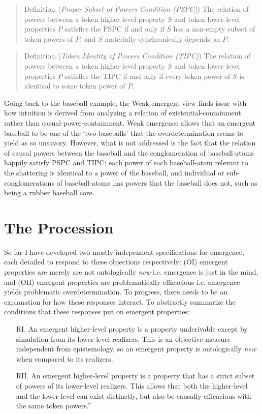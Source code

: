 \documentclass{article}
\newcommand{\ti}[1]{\textit{#1}}
\newcommand{\definition}{{\sc Definition.}\,}
\begin{document}
\begin{quote}
\definition (\ti{Proper Subset of Powers Condition (PSPC)}) The relation of powers between a token higher-level property $S$ and token lower-level properties $P$ satisfies the PSPC if and only if $S$ has a non-empty subset of token powers of $P$, and $S$ materially-synchronically depends on $P$.
\end{quote}

\begin{quote}
\definition (\ti{Token Identity of Powers Condition (TIPC)}) The relation of powers between a token higher-level property $S$ and token lower-level properties $P$ satisfies the TIPC if and only if every token power of $S$ is identical to some token power of $P$.
\end{quote}

Going back to the baseball example, the Weak emergent view finds issue with how intuition is derived from analyzing a relation of existential-containment rather than casual-power-containment. Weak emergence allows that an emergent baseball to be one of the `two baseballs' that the overdetermination seems to yield as so unsavory. However, what is not addressed is the fact that the relation of causal powers between the baseball and the conglomeration of baseball-atoms happily satisfy PSPC and TIPC: each power of each baseball-atom relevant to the shattering is identical to a power of the baseball, and individual or sub-conglomerations of baseball-atoms has powers that the baseball does not, such as being a rubber baseball core.

\section{The Procession}

So far I have developed two mostly-independent specifications for emergence, each detailed to respond to these objections respectively: (OI) emergent properties are merely are not ontologically \ti{new} i.e. emergence is just in the mind, and (OII) emergent properties are problematically efficacious i.e. emergence yields problematic overdetermination. To progress, there needs to be an explanation for how these responses interact. To abstractly summarize the conditions that these responses put on emergent properties:

\begin{itemize}
\item[RI.] An emergent higher-level property is a property underivable except by simulation from its lower-level realizers. This is an objective measure independent from epistemology, so an emergent property is ontologically \ti{new} when compared to its realizers.
\item[RII.] An emergent higher-level property is a property that has a strict subset of powers of its lower-level realizers. This allows that both the higher-level and the lower-level can exist distinctly, but also be causally efficacious with the same token powers.''
\end{itemize}
\end{document}
